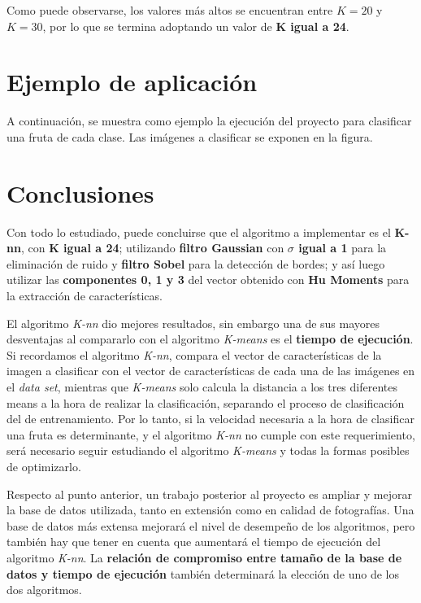 \documentclass[10pt,a4paper]{article}
\begin{document}
Como puede observarse, los valores más altos se encuentran entre $K=20$ y $K=30$, por lo que se termina adoptando un valor de \textbf{K igual a 24}.

\section{Ejemplo de aplicación}
A continuación, se muestra como ejemplo la ejecución del proyecto para clasificar una fruta de cada clase. Las imágenes a clasificar se exponen en la figura.

\section{Conclusiones}
Con todo lo estudiado, puede concluirse que el algoritmo a implementar es el \textbf{K-nn}, con \textbf{K igual a 24}; utilizando \textbf{filtro Gaussian} con \textbf{$\sigma$ igual a 1} para la eliminación de ruido y \textbf{filtro Sobel} para la detección de bordes; y así luego utilizar las \textbf{componentes 0, 1 y 3} del vector obtenido con \textbf{Hu Moments} para la extracción de características.

El algoritmo \textit{K-nn} dio mejores resultados, sin embargo una de sus mayores desventajas al compararlo con el algoritmo \textit{K-means} es el \textbf{tiempo de ejecución}. Si recordamos el algoritmo \textit{K-nn}, compara el vector de características de la imagen a clasificar con el vector de características de cada una de las imágenes en el \textit{data set}, mientras que \textit{K-means} solo calcula la distancia a los tres diferentes means a la hora de realizar la clasificación, separando el proceso de clasificación del de entrenamiento. Por lo tanto, si la velocidad necesaria a la hora de clasificar una fruta es determinante, y el algoritmo \textit{K-nn} no cumple con este requerimiento, será necesario seguir estudiando el algoritmo \textit{K-means} y todas la formas posibles de optimizarlo.

Respecto al punto anterior, un trabajo posterior al proyecto es ampliar y mejorar la base de datos utilizada, tanto en extensión como en calidad de fotografías. Una base de datos más extensa mejorará el nivel de desempeño de los algoritmos, pero también hay que tener en cuenta que aumentará el tiempo de ejecución del algoritmo \textit{K-nn}. La \textbf{relación de compromiso entre tamaño de la base de datos y tiempo de ejecución} también determinará la elección de uno de los dos algoritmos.
\end{document}
